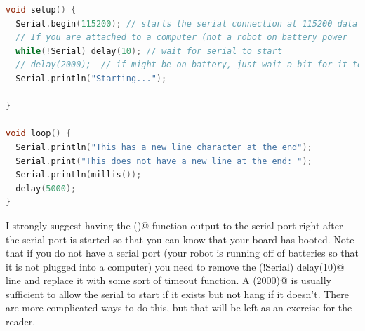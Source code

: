 \begin{lstlisting}[language=C++, caption={This is an example of how to start the serial port at 112,500 in the Arduino system.},label={lst:serial}]
void setup() {
  Serial.begin(115200); // starts the serial connection at 115200 data (baud) rate
  // If you are attached to a computer (not a robot on battery power
  while(!Serial) delay(10); // wait for serial to start
  // delay(2000);  // if might be on battery, just wait a bit for it to start
  Serial.println("Starting...");

}

void loop() {
  Serial.println("This has a new line character at the end");
  Serial.print("This does not have a new line at the end: ");
  Serial.println(millis());
  delay(5000);
}
\end{lstlisting}
I strongly suggest having the \lstinline@setup()@ function output to the serial port right after the serial port is started 
so that you can know that your board has booted. Note that if you do not have a serial port (your robot is running off of 
batteries so that it is not plugged into a computer) you need to remove the \lstinline@while(!Serial) delay(10)@ line and 
replace it with some sort of timeout function. A \lstinline@delay(2000)@ is usually sufficient to allow the serial to start 
if it exists but not hang if it doesn't. There are more complicated ways to do this, but that will be left as an exercise 
for the reader.
